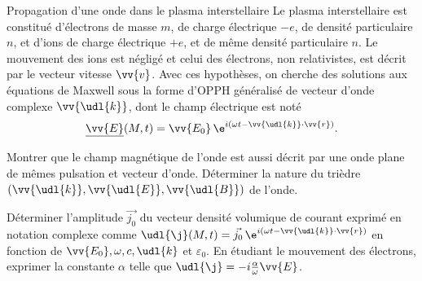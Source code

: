 \begin{exo}[PC][2][TD]{Propagation d'une onde dans le plasma interstellaire}
Le plasma interstellaire est constitué d'électrons de masse $m$, de charge électrique $-e$, de densité particulaire $n$, et d'ions de charge électrique $+e$, et de même densité particulaire $n$. %
Le mouvement des ions est négligé et celui des électrons, non relativistes, est décrit par le vecteur vitesse $\vv{v}$. Avec ces hypothèses, on cherche des solutions aux équations de Maxwell  sous la forme d'OPPH généralisé de vecteur d'onde complexe $\vv{\udl{k}}$, dont le champ électrique est noté
\begin{equation}
 \underline{\vv{E}}(M,t)=\vv{E_0}\,\e^{i(\omega t-\vv{\udl{k}}\cdot\vv{r})}.
 \end{equation}
\begin{quest}
\item Montrer que le champ magnétique de l'onde est aussi décrit par une onde plane de mêmes pulsation et vecteur d'onde. Déterminer la nature du trièdre $(\vv{\udl{k}},\vv{\udl{E}},\vv{\udl{B}})$ de l'onde.
\item Déterminer l'amplitude $\Vec{j_0}$ du vecteur densité volumique de courant exprimé en notation complexe comme $\udl{\j}(M,t)=\Vec{j_0}\,\e^{i(\omega t-\vv{\udl{k}}\cdot\vv{r})}$ en fonction de $\vv{E_0},\omega,c,\udl{k}$ et $\varepsilon_0$. En étudiant le mouvement des électrons, exprimer la constante $\alpha$ telle que $\udl{\j}=-i\frac{\alpha}{\omega}\vv{E}$.
\end{quest}
\end{exo}
